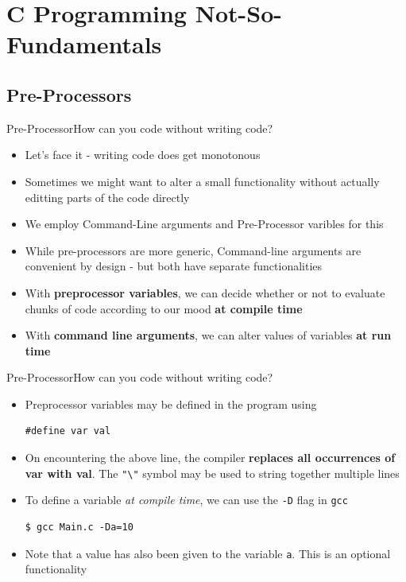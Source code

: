\documentclass{beamer}
\begin{document}
\section{C Programming Not-So-Fundamentals}
\subsection{Pre-Processors}
\begin{frame}[fragile]{Pre-Processor}{How can you code without writing code?}
\begin{itemize}
\item Let's face it - writing code does get monotonous
\item Sometimes we might want to alter a small functionality without actually editting parts of the code directly
\item We employ Command-Line arguments and Pre-Processor varibles for this
\item While pre-processors are more generic, Command-line arguments are convenient by design - but both have separate functionalities
\item With \textbf{preprocessor variables}, we can decide whether or not to evaluate chunks of code according to our mood \textbf{at compile time}
\item With \textbf{command line arguments}, we can alter values of variables \textbf{at run time}
\end{itemize}
\end{frame}

\begin{frame}[fragile]{Pre-Processor}{How can you code without writing code?}
\begin{itemize}
\item Preprocessor variables may be defined in the program using
\begin{verbatim}
#define var val
\end{verbatim}
\item On encountering the above line, the compiler \textbf{replaces all occurrences of var with val}. The \verb|"\"| symbol may be used to string together multiple lines
\item To define a variable \emph{at compile time}, we can use the \verb|-D| flag in \verb|gcc|
\begin{verbatim}
$ gcc Main.c -Da=10
\end{verbatim}
\item Note that a value has also been given to the variable \verb|a|. This is an optional functionality
\end{itemize}
\end{frame}
\end{document}
